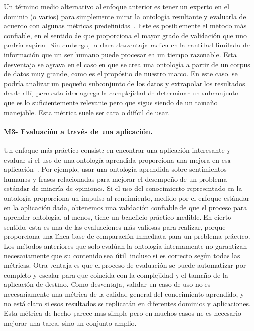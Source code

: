 Un término medio alternativo al enfoque anterior es tener un experto en el dominio (o varios) para simplemente mirar la ontología resultante y evaluarla de acuerdo con algunas métricas predefinidas~\cite{ROSPOCHER2016132}.
Este es posiblemente el método más confiable, en el sentido de que proporciona el mayor grado de validación que uno podría aspirar.
Sin embargo, la clara desventaja radica en la cantidad limitada de información que un ser humano puede procesar en un tiempo razonable.
Esta desventaja se agrava en el caso en que se crea una ontología a partir de un corpus de datos muy grande, como es el propósito de nuestro marco.
En este caso, se podría analizar un pequeño subconjunto de los datos y extrapolar los resultados desde allí, pero esta idea agrega la complejidad de determinar un subconjunto que es lo suficientemente relevante pero que sigue siendo de un tamaño manejable.
Esta métrica suele ser cara o difícil de usar.

\paragraph{M3- Evaluación a través de una aplicación.}

Un enfoque más práctico consiste en encontrar una aplicación interesante y evaluar si el uso de una ontología aprendida proporciona una mejora en esa aplicación~\cite{gurevych2003semantic}.
Por ejemplo, usar una ontología aprendida sobre sentimientos humanos y frases relacionadas para mejorar el desempeño de un problema estándar de minería de opiniones.
Si el uso del conocimiento representado en la ontología proporciona un impulso al rendimiento, medido por el enfoque estándar en la aplicación dada, obtenemos una validación confiable de que el proceso para aprender ontología, al menos, tiene un beneficio práctico medible.
En cierto sentido, esta es una de las evaluaciones más valiosas para realizar, porque proporciona una línea base de comparación inmediata para un problema práctico.
Los métodos anteriores que solo evalúan la ontología internamente no garantizan necesariamente que su contenido sea útil, incluso si es correcto según todas las métricas.
Otra ventaja es que el proceso de evaluación se puede automatizar por completo y escalar para que coincida con la complejidad y el tamaño de la aplicación de destino.
Como desventaja, validar un caso de uso no es necesariamente una métrica de la calidad general del conocimiento aprendido, y no está claro si esos resultados se replicarán en diferentes dominios y aplicaciones.
Esta métrica de hecho parece más simple pero en muchos casos no es necesario mejorar una tarea, sino un conjunto amplio.

